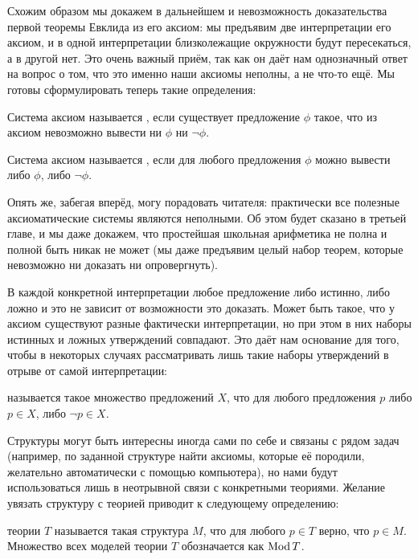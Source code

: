 Схожим образом мы докажем в дальнейшем и невозможность доказательства первой теоремы Евклида из его аксиом: мы предъявим две интерпретации его аксиом, и в одной интерпретации близколежащие окружности будут пересекаться, а в другой нет. Это очень важный приём, так как он даёт нам однозначный ответ на вопрос о том, что это именно наши аксиомы неполны, а не что-то ещё. Мы готовы сформулировать теперь такие определения:

\begin{definition}
Система аксиом называется , если существует предложение $\phi$ такое, что из аксиом невозможно вывести ни $\phi$ ни $\neg\phi$.
\end{definition}

\begin{definition}
Система аксиом называется , если для любого предложения $\phi$ можно вывести либо $\phi$, либо $\neg\phi$.
\end{definition}

Опять же, забегая вперёд, могу порадовать читателя: практически все полезные аксиоматические системы являются неполными. Об этом будет сказано в третьей главе, и мы даже докажем, что простейшая школьная арифметика не полна и полной быть никак не может (мы даже предъявим целый набор теорем, которые невозможно ни доказать ни опровергнуть).

В каждой конкретной интерпретации любое предложение либо истинно, либо ложно и это не зависит от возможности это доказать. Может быть такое, что у аксиом существуют разные фактически интерпретации, но при этом в них наборы истинных и ложных утверждений совпадают. Это даёт нам основание для того, чтобы в некоторых случаях рассматривать лишь такие наборы утверждений в отрыве от самой интерпретации:

\begin{definition}
 называется такое множество предложений $X$, что для любого предложения $p$ либо $p\in X$, либо $\neg p \in X$.
\end{definition}

Структуры могут быть интересны иногда сами по себе и связаны с рядом задач (например, по заданной структуре найти аксиомы, которые её породили, желательно автоматически с помощью компьютера), но нами будут использоваться лишь в неотрывной связи с конкретными теориями. Желание увязать структуру с теорией приводит к следующему определению:

\begin{definition}
 теории $T$ называется такая структура $M$, что для любого $p\in T$ верно, что $p\in M$. Множество всех моделей теории $T$ обозначается как $\operatorname{Mod} T$.
\end{definition}

